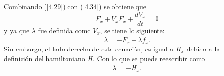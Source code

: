 Combinando (\ref{4.29}) con (\ref{4.34}) se obtiene que 
\begin{equation}
    F_x + V_xF_x + \frac{dV_x}{dt} = 0 
\end{equation}
y ya que $\lambda$ fue definida como $V_x$, se tiene lo siguiente:
\begin{equation}
    \dot \lambda = -F_x - \lambda f_x.
\end{equation}
Sin embargo, el lado derecho de esta ecuación, es igual a $H_x$ debido a la definición del hamiltoniano $H$. Con lo que se puede reescribir como 
\begin{equation}
    \dot \lambda = - H_x. 
\end{equation}

